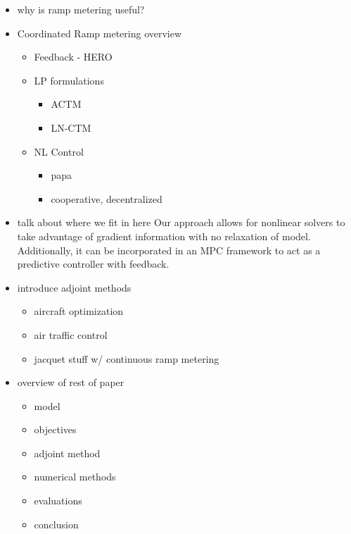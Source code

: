 
\begin{itemize}
  \item why is ramp metering useful?
  \item Coordinated Ramp metering overview
  \begin{itemize}
    \item Feedback - HERO \cite{Papamichail2008}
    \item LP formulations
    \begin{itemize}
      \item ACTM \cite{gomes2006optimal}
      \item LN-CTM \cite{Muralidharana}
    \end{itemize}
    \item NL Control
    \begin{itemize}
          \item \cite{Kotsialos2004} papa
          \item cooperative, decentralized \cite{Ramon2013}
        \end{itemize}
  \end{itemize}
  \item talk about where we fit in here
  Our approach allows for nonlinear solvers to take advantage of gradient information with no relaxation of model. Additionally, it can be incorporated in an MPC framework to act as a predictive controller with feedback.
  \item introduce adjoint methods
  \begin{itemize}
    \item aircraft optimization \cite{Giles2000}
    \item air traffic control \cite{Bayen2006}
    \item jacquet stuff w/ continuous ramp metering \cite{Jacquet2005}
  \end{itemize}
  \item overview of rest of paper
  \begin{itemize}
    \item model
    \item objectives
    \item adjoint method
    \item numerical methods
    \item evaluations
    \item conclusion
  \end{itemize}
\end{itemize}